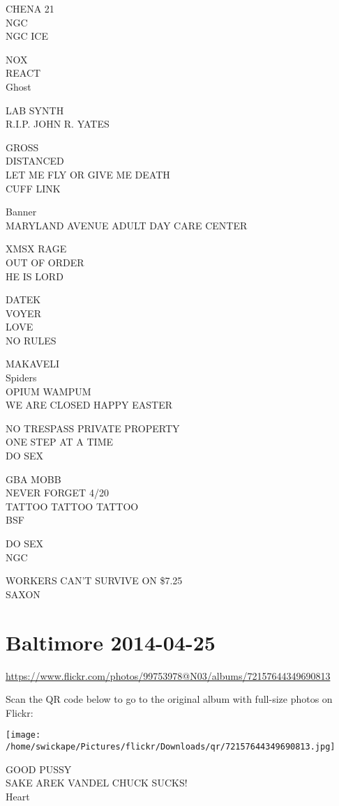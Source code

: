 \documentclass[10pt,letterpaper]{article}
\begin{document}
CHENA 21\\
NGC\\
NGC ICE

NOX\\
REACT\\
Ghost

LAB SYNTH\\
R.I.P. JOHN R. YATES

GROSS\\
DISTANCED\\
LET ME FLY OR GIVE ME DEATH\\
CUFF LINK

Banner\\
MARYLAND AVENUE ADULT DAY CARE CENTER

XMSX RAGE\\
OUT OF ORDER\\
HE IS LORD

DATEK\\
VOYER\\
LOVE\\
NO RULES

MAKAVELI\\
Spiders\\
OPIUM WAMPUM\\
WE ARE CLOSED HAPPY EASTER

NO TRESPASS PRIVATE PROPERTY\\
ONE STEP AT A TIME\\
DO SEX

GBA MOBB\\
NEVER FORGET 4/20\\
TATTOO TATTOO TATTOO\\
BSF

DO SEX\\
NGC

WORKERS CAN'T SURVIVE ON \$7.25\\
SAXON
\pagebreak

\section*{Baltimore 2014-04-25}

\url{https://www.flickr.com/photos/99753978@N03/albums/72157644349690813}

Scan the QR code below to go to the original album with full-size photos on Flickr:

\texttt{[image: /home/swickape/Pictures/flickr/Downloads/qr/72157644349690813.jpg]}
\pagebreak

GOOD PUSSY\\
SAKE AREK VANDEL CHUCK SUCKS!\\
Heart
\end{document}
